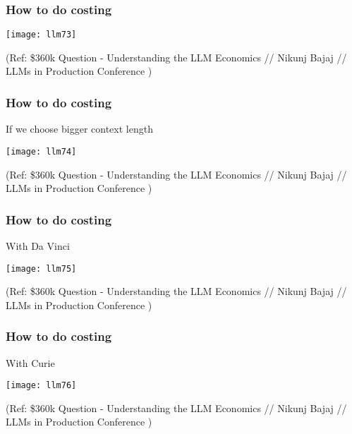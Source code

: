 \begin{frame}[fragile]\frametitle{How to do costing}


\begin{center}
\texttt{[image: llm73]}
\end{center}		



{\tiny (Ref: \$360k Question - Understanding the LLM Economics // Nikunj Bajaj // LLMs in Production Conference )}

\end{frame}

\begin{frame}[fragile]\frametitle{How to do costing}

If we choose bigger context length

\begin{center}
\texttt{[image: llm74]}
\end{center}		



{\tiny (Ref: \$360k Question - Understanding the LLM Economics // Nikunj Bajaj // LLMs in Production Conference )}

\end{frame}

\begin{frame}[fragile]\frametitle{How to do costing}

With Da Vinci

\begin{center}
\texttt{[image: llm75]}
\end{center}		



{\tiny (Ref: \$360k Question - Understanding the LLM Economics // Nikunj Bajaj // LLMs in Production Conference )}

\end{frame}

\begin{frame}[fragile]\frametitle{How to do costing}

With Curie

\begin{center}
\texttt{[image: llm76]}
\end{center}		



{\tiny (Ref: \$360k Question - Understanding the LLM Economics // Nikunj Bajaj // LLMs in Production Conference )}

\end{frame}

